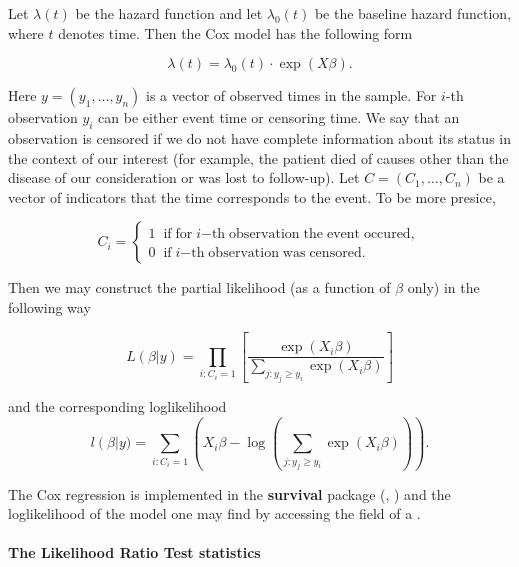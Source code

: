 Let $\lambda(t)$ be the hazard function and let $\lambda_0(t)$ be the baseline hazard function, where $t$ denotes time. Then the Cox model has the following form

$$\lambda(t) = 
\lambda_0(t)\cdot \exp{(X\beta)}.$$

Here $y = (y_1, \ldots, y_n)$ is a vector of observed times in the sample. For $i$-th observation $y_i$ can be either event time or censoring time. We say that an observation is censored if we do not have complete information about its status in the context of our interest (for example, the patient died  of causes other than the disease of our consideration or was lost to follow-up). Let $C = (C_1, \ldots, C_n)$ be a vector of indicators that the time corresponds to the event. To be more presice,

$$C_i = \left\{
                \begin{array}{ll}
                  1 \;\; \mathrm{if \; for} \; i 
                  \mathrm{-th \; 
                  observation \; the \; event \; occured,} \\
                  0 \;\; \mathrm{if} \; i \mathrm{-th \;
                  observation \; was \; censored.}
                \end{array}
              \right.$$

Then we may construct the partial likelihood (as a function of $\beta$ only) in the following way

$$L(\beta|y) = 
	\prod_{i: C_i = 1}
		\left[
			\frac{\exp{\left(X_i\beta\right)}}
					{\sum_{j: y_j \geq y_i} 
					\exp{\left(X_i\beta\right)}}
			\right]$$
			
and the corresponding loglikelihood
$$
l\left(\beta\right|y) = 
	\sum_{i:C_i = 1} 
		\left(
			X_i\beta -
			\log{
				\left(
				\sum_{j:y_j\geq y_i} 
				\exp{\left(X_i\beta\right)}		
				\right)
			}
		\right).
$$


The Cox regression is implemented in the \textbf{survival} package (, \citealp{survival-book})
and the loglikelihood of the model one may find by accessing the field  of a .

\break

\paragraph{The Likelihood Ratio Test statistics}

